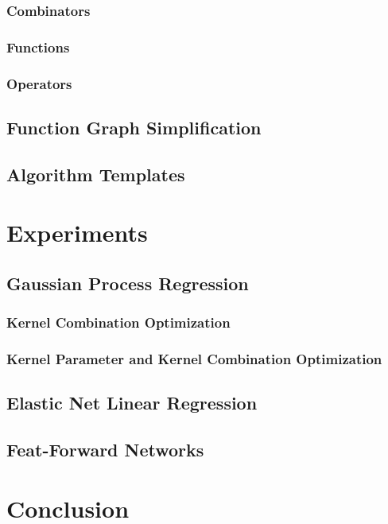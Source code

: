 \documentclass[english]{article}
\begin{document}
\subsubsection{Combinators}

\subsubsection{Functions}

\subsubsection{Operators}

\subsection{Function Graph Simplification}


\subsection{Algorithm Templates}


\section{Experiments}



\subsection{Gaussian Process Regression}
\subsubsection{Kernel Combination Optimization}
\subsubsection{Kernel Parameter and Kernel Combination Optimization}
\subsection{Elastic Net Linear Regression}
\subsection{Feat-Forward Networks}

\section{Conclusion}
\end{document}
